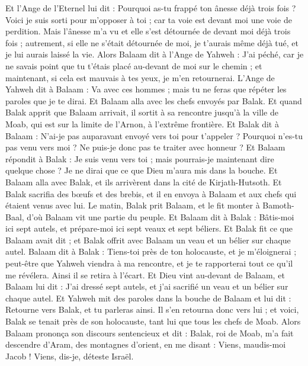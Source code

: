 \begin{multicols}{2}
Et l'Ange de l'Eternel lui dit : Pourquoi as-tu frappé ton ânesse déjà trois fois ? Voici je suis sorti pour m'opposer à toi ; car ta voie est devant moi une voie de perdition.
Mais l'ânesse m'a vu et elle s'est détournée de devant moi déjà trois fois ; autrement, si elle ne s'était détournée de moi, je t'aurais même déjà tué, et je lui aurais laissé la vie.
Alors Balaam dit à l'Ange de Yahweh : J'ai péché, car je ne savais point que tu t'étais placé au-devant de moi sur le chemin ; et maintenant, si cela est mauvais à tes yeux, je m’en retournerai.
L'Ange de Yahweh dit à Balaam : Va avec ces hommes ; mais tu ne feras que répéter les paroles que je te dirai. Et Balaam alla avec les chefs envoyés par Balak.
Et quand Balak apprit que Balaam arrivait, il sortit à sa rencontre jusqu'à la ville de Moab, qui est sur la limite de l'Arnon, à l'extrême frontière.
Et Balak dit à Balaam : N'ai-je pas auparavant envoyé vers toi pour t'appeler ? Pourquoi n'es-tu pas venu vers moi ? Ne puis-je donc pas te traiter avec honneur ?
Et Balaam répondit à Balak : Je suis venu vers toi ; mais pourrais-je maintenant dire quelque chose ? Je ne dirai que ce que Dieu m'aura mis dans la bouche.
Et Balaam alla avec Balak, et ils arrivèrent dans la cité de Kirjath-Hutsoth.
Et Balak sacrifia des bœufs et des brebis, et il en envoya à Balaam et aux chefs qui étaient venus avec lui.
Le matin, Balak prit Balaam, et le fit monter à Bamoth-Baal, d'où Balaam vit une partie du peuple.
\VerseOne{}Et Balaam dit à Balak : Bâtis-moi ici sept autels, et prépare-moi ici sept veaux et sept béliers.
Et Balak fit ce que Balaam avait dit ; et Balak offrit avec Balaam un veau et un bélier sur chaque autel.
Balaam dit à Balak : Tiens-toi près de ton holocauste, et je m'éloignerai ; peut-être que Yahweh viendra à ma rencontre, et je te rapporterai tout ce qu'il me révélera. Ainsi il se retira à l'écart.
Et Dieu vint au-devant de Balaam, et Balaam lui dit : J'ai dressé sept autels, et j'ai sacrifié un veau et un bélier sur chaque autel.
Et Yahweh mit des paroles dans la bouche de Balaam et lui dit : Retourne vers Balak, et tu parleras ainsi.
Il s'en retourna donc vers lui ; et voici, Balak se tenait près de son holocauste, tant lui que tous les chefs de Moab.
Alors Balaam prononça son discours sentencieux et dit : Balak, roi de Moab, m'a fait descendre d'Aram, des montagnes d'orient, en me disant : Viens, maudis-moi Jacob ! Viens, dis-je, déteste Israël.

\end{multicols}
